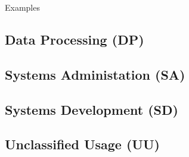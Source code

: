 			Examples


	\subsection{Data Processing (DP)}

	\subsection{Systems Administation (SA)}

	\subsection{Systems Development (SD)}

	\subsection{Unclassified Usage (UU)}